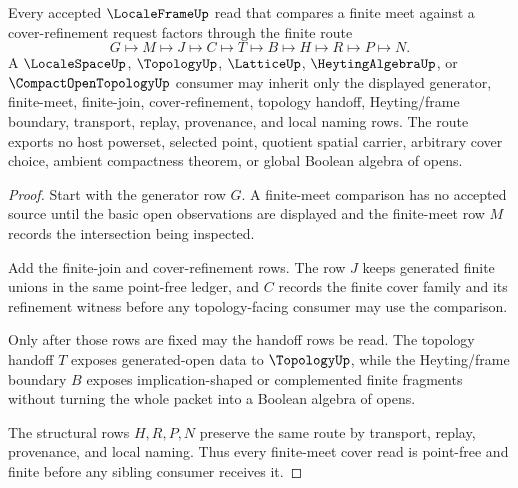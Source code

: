 \begin{theorem}
\label{thm:locale-frame-finite-meet-cover-route}
Every accepted $\LocaleFrameUp$ read that compares a finite meet against a cover-refinement request factors through the finite route
$$
G \longmapsto M \longmapsto J \longmapsto C \longmapsto T \longmapsto B \longmapsto H \longmapsto R \longmapsto P \longmapsto N .
$$
A $\LocaleSpaceUp$, $\TopologyUp$, $\LatticeUp$, $\HeytingAlgebraUp$, or $\CompactOpenTopologyUp$ consumer may inherit only the displayed generator, finite-meet, finite-join, cover-refinement, topology handoff, Heyting/frame boundary, transport, replay, provenance, and local naming rows. The route exports no host powerset, selected point, quotient spatial carrier, arbitrary cover choice, ambient compactness theorem, or global Boolean algebra of opens.
\end{theorem}
\begin{proof}
Start with the generator row $G$. A finite-meet comparison has no accepted source until the basic open observations are displayed and the finite-meet row $M$ records the intersection being inspected.

Add the finite-join and cover-refinement rows. The row $J$ keeps generated finite unions in the same point-free ledger, and $C$ records the finite cover family and its refinement witness before any topology-facing consumer may use the comparison.

Only after those rows are fixed may the handoff rows be read. The topology handoff $T$ exposes generated-open data to $\TopologyUp$, while the Heyting/frame boundary $B$ exposes implication-shaped or complemented finite fragments without turning the whole packet into a Boolean algebra of opens.

The structural rows $H,R,P,N$ preserve the same route by transport, replay, provenance, and local naming. Thus every finite-meet cover read is point-free and finite before any sibling consumer receives it.
\end{proof}



